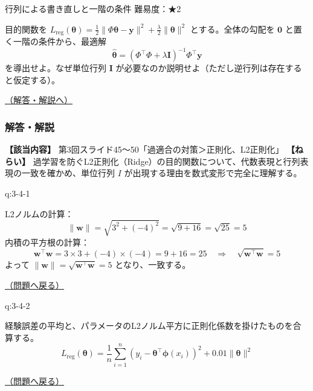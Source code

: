 \begin{questionbox}[label=q:3-4-3]{行列による書き直しと一階の条件 \hfill \normalfont \small 難易度：★2}

目的関数を
\(L_{\text{reg}}(\boldsymbol{\theta}) = \frac{1}{2}\|\Phi\boldsymbol{\theta} - \mathbf{y}\|^2 + \frac{\lambda}{2}\|\boldsymbol{\theta}\|^2\)
とする。全体の勾配を \(\mathbf{0}\) と置く一階の条件から、最適解 \[
\hat{\boldsymbol{\theta}} = (\Phi^\top \Phi + \lambda \mathbf{I})^{-1}\Phi^\top \mathbf{y}
\] を導出せよ。なぜ単位行列 \(\mathbf{I}\)
が必要なのか説明せよ（ただし逆行列は存在すると仮定する）。

\hfill 

\hyperref[a:3-4-3]{（解答・解説へ）}

\end{questionbox}

\subsubsection{解答・解説}\label{ux89e3ux7b54ux89e3ux8aac-8}

\textbf{【該当内容】}
第3回スライド45〜50「過適合の対策＞正則化、L2正則化」
\textbf{【ねらい】}
過学習を防ぐL2正則化（Ridge）の目的関数について、代数表現と行列表現の一致を確かめ、単位行列
\(I\) が出現する理由を数式変形で完全に理解する。

\begin{answerbox}[phantomlabel=a:3-4-1]{q:3-4-1}

L2ノルムの計算： \[
\|\mathbf{w}\| = \sqrt{3^2 + (-4)^2} = \sqrt{9 + 16} = \sqrt{25} = 5
\] 内積の平方根の計算： \[
\mathbf{w}^\top \mathbf{w} = 3 \times 3 + (-4) \times (-4) = 9 + 16 = 25 \quad \Rightarrow \quad \sqrt{\mathbf{w}^\top \mathbf{w}} = 5
\] よって \(\|\mathbf{w}\| = \sqrt{\mathbf{w}^\top \mathbf{w}} = 5\)
となり、一致する。

\hfill 

\hyperref[q:3-4-1]{（問題へ戻る）}

\end{answerbox}

\begin{answerbox}[phantomlabel=a:3-4-2]{q:3-4-2}

経験誤差の平均と、パラメータのL2ノルム平方に正則化係数を掛けたものを合算する。
\[
L_{\text{reg}}(\boldsymbol{\theta}) = \frac{1}{n} \sum_{i=1}^n (y_i - \boldsymbol{\theta}^\top \boldsymbol{\phi}(x_i))^2 + 0.01 \|\boldsymbol{\theta}\|^2
\]

\hfill 

\hyperref[q:3-4-2]{（問題へ戻る）}

\end{answerbox}

